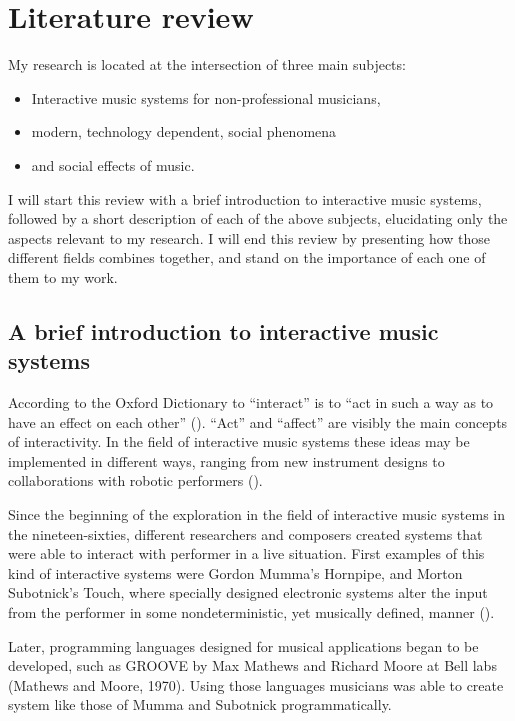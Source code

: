 \section{Literature review}

My research is located at the intersection of three main subjects:
\begin{itemize}
	\item Interactive music systems for non-professional musicians,
	\item modern, technology dependent, social phenomena
	\item and social effects of music.
\end{itemize}
I will start this review with a brief introduction to interactive music systems, followed by a short description of each of the above subjects, elucidating only the aspects relevant to my research. I will end this review by presenting how those different fields combines together, and stand on the importance of each one of them to my work.

\subsection{A brief introduction to interactive music systems}

According to the Oxford Dictionary to ``interact'' is to ``act in such a way as to have an effect on each other'' (\cite{web:oxford}). ``Act'' and ``affect'' are visibly the main concepts of interactivity. In the field of interactive music systems these ideas may be implemented in different ways, ranging from new instrument designs to collaborations with robotic performers (\cite{drummond09}).

Since the beginning of the exploration in the field of interactive music systems in the nineteen-sixties, different researchers and composers created systems that were able to interact with performer in a live situation. First examples of this kind of interactive systems were Gordon Mumma's Hornpipe, and Morton Subotnick's Touch, where specially designed electronic systems alter the input from the performer in some nondeterministic, yet musically defined, manner (\cite[page 12]{winkler01}).

Later, programming languages designed for musical applications began to be developed, such as GROOVE by Max Mathews and Richard Moore at Bell labs (Mathews and Moore, 1970). Using those languages musicians was able to create system like those of Mumma and Subotnick programmatically.

